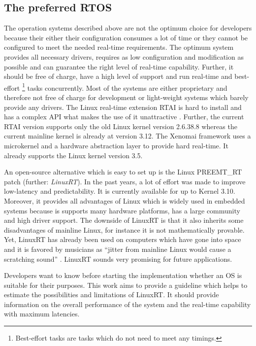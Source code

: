 \subsection{The preferred RTOS}
The operation systems described above are not the optimum choice for developers because their either their configuration consumes a lot of time or they cannot be configured to meet the needed real-time requirements.
The optimum system provides all necessary drivers, requires as low configuration and modification as possible and can guarantee the right level of real-time capability. 
Further, it should be free of charge, have a high level of support and run real-time and best-effort \footnote{Best-effort tasks are tasks which do not need to meet any timings.} tasks concurrently.
Most of the systems are either proprietary and therefore not free of charge for development or light-weight systems which barely provide any drivers.
The Linux real-time extension \ac{RTAI} is hard to install and has a complex \ac{API} what makes the use of it unattractive \cite{mitschang:heulfrvr}.
Further, the current \ac{RTAI} version supports only the old Linux kernel version 2.6.38.8 \cite{rtai} whereas the current mainline kernel is already at version 3.12. 
The Xenomai framework uses a microkernel and a hardware abstraction layer to provide hard real-time. 
It already supports the Linux kernel version 3.5.
\par
An open-source alternative which is easy to set up is the Linux PREEMT\_RT patch (further: \textit{LinuxRT}).
In the past years, a lot of effort was made to improve low-latency and predictability.
It is currently available for up to Kernel 3.10.
Moreover, it provides all advantages of Linux which is widely used in embedded systems because is supports many hardware platforms, has a large community and high driver support.
The downside of LinuxRT is that it also inherits some disadvantages of mainline Linux, for instance it is not mathematically provable.
Yet, LinuxRT has already been used on computers which have gone into space and it is favored by musicians as ``jitter from mainline Linux would cause a scratching sound'' \cite{clark:itrtlfed}.
LinuxRT sounds very promising for future applications.
\par
Developers want to know before starting the implementation whether an \ac{OS} is suitable for their purposes.
This work aims to provide a guideline which helps to estimate the possibilities and limitations of LinuxRT. 
It should provide information on the overall performance of the system and the real-time capability with maximum latencies.  
